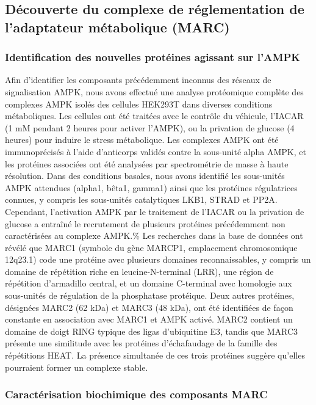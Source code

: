 \documentclass[11pt,a4paper]{article}
\begin{document}
\subsection{Découverte du complexe de réglementation de l'adaptateur métabolique (MARC)}

\subsubsection{Identification des nouvelles protéines agissant sur l'AMPK}

Afin d'identifier les composants précédemment inconnus des réseaux de signalisation AMPK, nous avons effectué une analyse protéomique complète des complexes AMPK isolés des cellules HEK293T dans diverses conditions métaboliques. Les cellules ont été traitées avec le contrôle du véhicule, l'IACAR (1 mM pendant 2 heures pour activer l'AMPK), ou la privation de glucose (4 heures) pour induire le stress métabolique. Les complexes AMPK ont été immunoprécisés à l'aide d'anticorps validés contre la sous-unité alpha AMPK, et les protéines associées ont été analysées par spectrométrie de masse à haute résolution. Dans des conditions basales, nous avons identifié les sous-unités AMPK attendues (alpha1, bêta1, gamma1) ainsi que les protéines régulatrices connues, y compris les sous-unités catalytiques LKB1, STRAD et PP2A. Cependant, l'activation AMPK par le traitement de l'IACAR ou la privation de glucose a entraîné le recrutement de plusieurs protéines précédemment non caractérisées au complexe AMPK.\% Les recherches dans la base de données ont révélé que MARC1 (symbole du gène MARCP1, emplacement chromosomique 12q23.1) code une protéine avec plusieurs domaines reconnaissables, y compris un domaine de répétition riche en leucine-N-terminal (LRR), une région de répétition d'armadillo central, et un domaine C-terminal avec homologie aux sous-unités de régulation de la phosphatase protéique. Deux autres protéines, désignées MARC2 (62 kDa) et MARC3 (48 kDa), ont été identifiées de façon constante en association avec MARC1 et AMPK activé. MARC2 contient un domaine de doigt RING typique des ligas d'ubiquitine E3, tandis que MARC3 présente une similitude avec les protéines d'échafaudage de la famille des répétitions HEAT. La présence simultanée de ces trois protéines suggère qu'elles pourraient former un complexe stable.

\subsubsection{Caractérisation biochimique des composants MARC}
\end{document}
